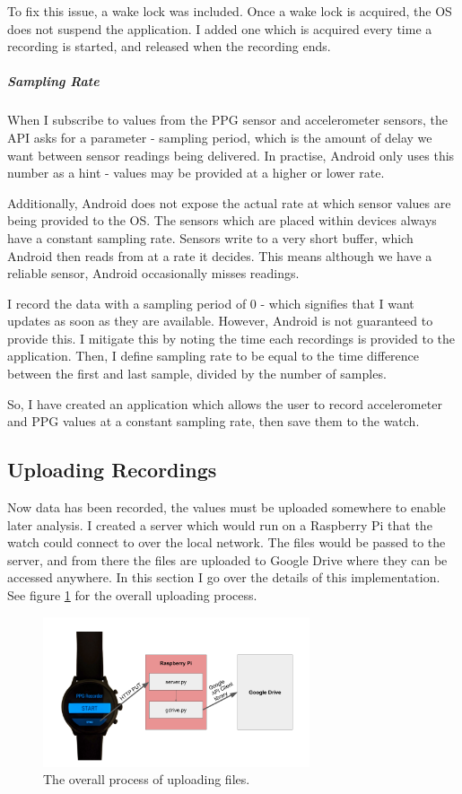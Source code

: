 \documentclass[12pt,a4paper,twoside,openright]{report}
\begin{document}
To fix this issue, a wake lock was included. Once a wake lock is acquired, the
OS does not suspend the application. I added one which is acquired every time
a recording is started, and released when the recording ends.

\subparagraph{Sampling Rate}

When I subscribe to values from the PPG sensor and accelerometer sensors, the
API asks for a parameter - sampling period, which is the amount of delay we
want between sensor readings being delivered. In practise, Android only uses
this number as a hint - values may be provided at a higher or lower rate.

Additionally, Android does not expose the actual rate at which sensor values
are being provided to the OS. The sensors which are placed within devices
always have a constant sampling rate. Sensors write to a very short buffer,
which Android then reads from at a rate it decides. This means although we
have a reliable sensor, Android occasionally misses readings.

I record the data with a sampling period of 0 - which signifies that I want
updates as soon as they are available. However, Android is not guaranteed to
provide this. I mitigate this by noting the time each recordings is provided to the
application. Then, I define sampling rate to be equal to the time difference
between the first and last sample, divided by the number of samples.

So, I have created an application which allows the user to record
accelerometer and PPG values at a constant sampling rate, then save them to
the watch.

\subsection{Uploading Recordings}

Now data has been recorded, the values must be uploaded somewhere to enable
later analysis. I created a server which would run on a Raspberry Pi that the
watch could connect to over the local network. The files would be passed to
the server, and from there the files are uploaded to Google Drive where they
can be accessed anywhere. In this section I go over the details of this
implementation. See figure \ref{fig:upload} for the overall uploading process.

\begin{figure}[tbh]
	\centerline{\includegraphics[width=0.7\textwidth]{figs/upload.png}}
	\caption{The overall process of uploading files.}
	\label{fig:upload}
\end{figure}
\end{document}
